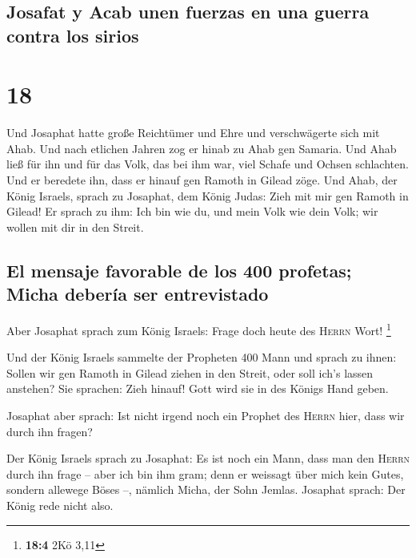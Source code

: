 \hypertarget{josafat-y-acab-unen-fuerzas-en-una-guerra-contra-los-sirios}{%
\subsection{Josafat y Acab unen fuerzas en una guerra contra los
sirios}\label{josafat-y-acab-unen-fuerzas-en-una-guerra-contra-los-sirios}}

\hypertarget{section-17}{%
\section{18}\label{section-17}}

 Und Josaphat hatte große Reichtümer und Ehre und
verschwägerte sich mit Ahab.  Und nach etlichen Jahren zog
er hinab zu Ahab gen Samaria. Und Ahab ließ für ihn und für das Volk,
das bei ihm war, viel Schafe und Ochsen schlachten. Und er beredete ihn,
dass er hinauf gen Ramoth in Gilead zöge.  Und Ahab, der
König Israels, sprach zu Josaphat, dem König Judas: Zieh mit mir gen
Ramoth in Gilead! Er sprach zu ihm: Ich bin wie du, und mein Volk wie
dein Volk; wir wollen mit dir in den Streit.

\hypertarget{el-mensaje-favorable-de-los-400-profetas-micha-deberuxeda-ser-entrevistado}{%
\subsection{El mensaje favorable de los 400 profetas; Micha debería ser
entrevistado}\label{el-mensaje-favorable-de-los-400-profetas-micha-deberuxeda-ser-entrevistado}}

 Aber Josaphat sprach zum König Israels: Frage doch heute
des \textsc{Herrn} Wort! \footnote{\textbf{18:4} 2Kö 3,11}

 Und der König Israels sammelte der Propheten 400 Mann und
sprach zu ihnen: Sollen wir gen Ramoth in Gilead ziehen in den Streit,
oder soll ich's lassen anstehen? Sie sprachen: Zieh hinauf! Gott wird
sie in des Königs Hand geben.

 Josaphat aber sprach: Ist nicht irgend noch ein Prophet
des \textsc{Herrn} hier, dass wir durch ihn fragen?

 Der König Israels sprach zu Josaphat: Es ist noch ein
Mann, dass man den \textsc{Herrn} durch ihn frage -- aber ich bin ihm
gram; denn er weissagt über mich kein Gutes, sondern allewege Böses --,
nämlich Micha, der Sohn Jemlas. Josaphat sprach: Der König rede nicht
also.

